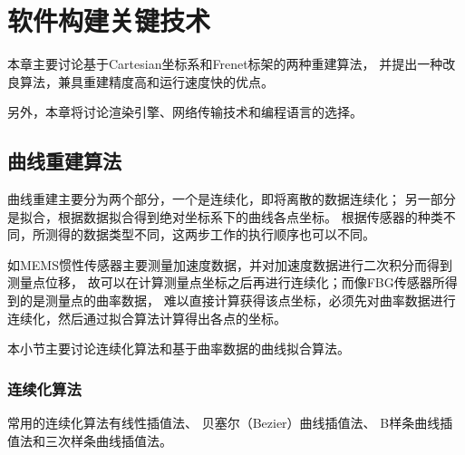 \clearpage

\section{软件构建关键技术}
\label{sec:skills}

本章主要讨论基于Cartesian坐标系和Frenet标架的两种重建算法，
并提出一种改良算法，兼具重建精度高和运行速度快的优点。

另外，本章将讨论渲染引擎、网络传输技术和编程语言的选择。

\subsection{曲线重建算法}
\label{sec:reconst}
曲线重建主要分为两个部分，一个是连续化，即将离散的数据连续化；
另一部分是拟合，根据数据拟合得到绝对坐标系下的曲线各点坐标。
根据传感器的种类不同，所测得的数据类型不同，这两步工作的执行顺序也可以不同。

如MEMS惯性传感器主要测量加速度数据，并对加速度数据进行二次积分而得到测量点位移，
故可以在计算测量点坐标之后再进行连续化；而像FBG传感器所得到的是测量点的曲率数据，
难以直接计算获得该点坐标，必须先对曲率数据进行连续化，然后通过拟合算法计算得出各点的坐标。

本小节主要讨论连续化算法和基于曲率数据的曲线拟合算法。

\subsubsection{连续化算法}
常用的连续化算法有线性插值法、
贝塞尔（Bezier）曲线插值法、
B样条曲线插值法和三次样条曲线插值法。

